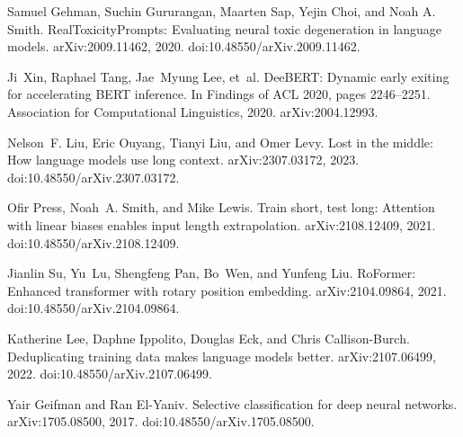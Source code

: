 \documentclass[10pt]{article}
\begin{document}
\begin{thebibliography}{99}
Samuel Gehman, Suchin Gururangan, Maarten Sap, Yejin Choi, and Noah A. Smith.
\newblock RealToxicityPrompts: Evaluating neural toxic degeneration in language models.
\newblock arXiv:2009.11462, 2020.
\newblock doi:10.48550/arXiv.2009.11462.

Ji~Xin, Raphael Tang, Jae~Myung Lee, et~al.
\newblock DeeBERT: Dynamic early exiting for accelerating BERT inference.
\newblock In Findings of ACL 2020, pages 2246--2251. Association for Computational Linguistics, 2020.
\newblock arXiv:2004.12993.

Nelson~F. Liu, Eric Ouyang, Tianyi Liu, and Omer Levy.
\newblock Lost in the middle: How language models use long context.
\newblock arXiv:2307.03172, 2023.
\newblock doi:10.48550/arXiv.2307.03172.

Ofir Press, Noah~A. Smith, and Mike Lewis.
\newblock Train short, test long: Attention with linear biases enables input length extrapolation.
\newblock arXiv:2108.12409, 2021.
\newblock doi:10.48550/arXiv.2108.12409.

Jianlin Su, Yu~Lu, Shengfeng Pan, Bo~Wen, and Yunfeng Liu.
\newblock RoFormer: Enhanced transformer with rotary position embedding.
\newblock arXiv:2104.09864, 2021.
\newblock doi:10.48550/arXiv.2104.09864.

Katherine Lee, Daphne Ippolito, Douglas Eck, and Chris Callison-Burch.
\newblock Deduplicating training data makes language models better.
\newblock arXiv:2107.06499, 2022.
\newblock doi:10.48550/arXiv.2107.06499.

Yair Geifman and Ran El-Yaniv.
\newblock Selective classification for deep neural networks.
\newblock arXiv:1705.08500, 2017.
\newblock doi:10.48550/arXiv.1705.08500.

\end{thebibliography}
\end{document}
